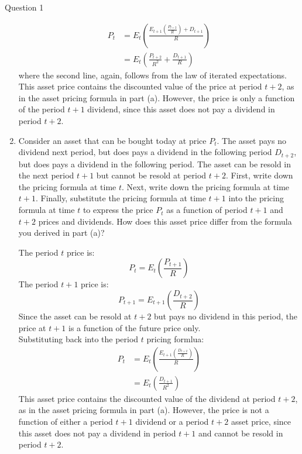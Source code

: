 \documentclass[a4paper]{article}
\newif\IfInSansMode
\begin{document}
\begin{questionbox}{Question 1}
\begin{enumerate}[resume*]
\begin{explanationbox}
\begin{align*}
					P_t &= E_t \left( \frac{E_{t+1} \left( \frac{P_{t+2}}{R} \right) + D_{t+1}}{R} \right)\\
					&=E_t \left( \frac{P_{t+2}}{R^2} + \frac{D_{t+1}}{R} \right)
				\end{align*}
				where the second line, again, follows from the law of iterated expectations.\\
				This asset price contains the discounted value of the price at period \( t+2 \), as in the asset pricing formula in part (a). However, the price is only a function of the period \( t+1 \) dividend, since this asset does not pay a dividend in period \( t+2 \).
			\end{explanationbox}
			\item Consider an asset that can be bought today at price \( P_t \). The asset pays no dividend next period, but does pays a dividend in the following period \( D_{t+2} \), but does pays a dividend in the following period. The asset can be resold in the next period \( t+1 \) but cannot be resold at period \( t+2 \). First, write down the pricing formula at time \( t \). Next, write down the pricing formula at time \( t+1 \). Finally, substitute the pricing formula at time \( t+1 \) into the pricing formula at time \( t \) to express the price \( P_t \) as a function of period \( t+1 \) and \( t+2 \) prices and dividends. How does this asset price differ from the formula you derived in part (a)?
			\begin{explanationbox}
				The period \( t \) price is:
				\[
					P_t = E_t \left( \frac{P_{t+1}}{R} \right)
				\]
				The period \( t+1 \) price is:
				\[
					P_{t+1} = E_{t+1}\left( \frac{D_{t+2}}{R} \right)
				\]
				Since the asset can be resold at \( t+2 \) but pays no dividend in this period, the price at \( t+1 \) is a function of the future price only.\\
				Substituting back into the period \( t \) pricing formlua:
				\begin{align*}
					P_t &= E_t \left( \frac{E_{t+1} \left( \frac{D_{t+2}}{R} \right)}{R} \right)\\
					&=E_t \left( \frac{D_{t+1}}{R^2} \right)
				\end{align*}
				This asset price contains the discounted value of the dividend at period \( t+2 \), as in the asset pricing formula in part (a). However, the price is not a function of either a period \( t+1 \) dividend or a period \( t+2 \) asset price, since this asset does not pay a dividend in period \( t+1 \) and cannot be resold in period \( t+2 \).
			\end{explanationbox}
		\end{enumerate}
	\end{questionbox}
\end{document}
